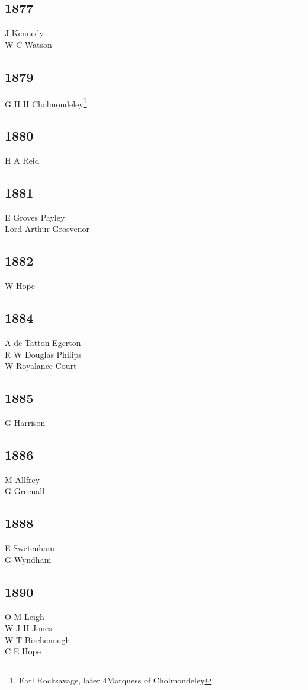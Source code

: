\begin{multicols}{3}
  \subsection*{1877}
  J Kennedy \\
  W C Watson \\
  \subsection*{1879}
  G H H Cholmondeley\footnote{Earl Rocksavage, later 4\nth Marquess of Cholmondeley} \\
  \subsection*{1880}
  H A Reid \\
  \subsection*{1881}
  E Groves Payley \\
  Lord Arthur Grosvenor \\
  \subsection*{1882}
  W Hope \\
  \subsection*{1884}
  A de Tatton Egerton \\
  R W Douglas Philips \\
  W Royalance Court \\
  \subsection*{1885}
  G Harrison \\
  \subsection*{1886}
  M Allfrey \\
  G Greenall \\
  \subsection*{1888}
  E Swetenham \\
  G Wyndham \\
  \subsection*{1890}
  O M Leigh \\
  W J H Jones \\
  W T Birchenough \\
  C E Hope \\

\end{multicols}
